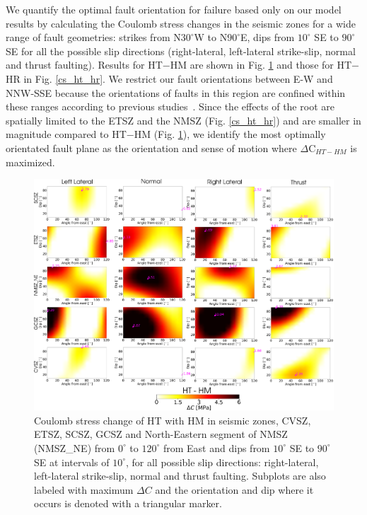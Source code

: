 \documentclass[draft,linenumbers]{agujournal2018}
\begin{document}
     We quantify the optimal fault orientation for failure based only on our model results by calculating the Coulomb stress changes in the seismic zones for a wide range of fault geometries: strikes from N$30^\circ$W to N$90^\circ$E, dips from $10^\circ$ SE to $90^\circ$ SE %
     for all the possible slip directions (right-lateral, left-lateral strike-slip, normal and thrust faulting). Results for HT$-$HM are shown in Fig. \ref{cs_ht_hm} and those for HT$-$HR in Fig. \ref{cs_ht_hr}. We restrict our fault orientations between E-W and NNW-SSE because the orientations of faults in this region are confined within these ranges according to previous studies~\citep{shumway2008focal, hurd2012intraplate, johnson2014earthquake, cooley2015new}. Since the effects of the root are spatially limited to the ETSZ and the NMSZ (Fig. \ref{cs_ht_hr}) and are smaller in magnitude compared to HT$-$HM (Fig. \ref{cs_ht_hm}), we identify the most optimally orientated fault plane as the orientation and sense of motion where $\Delta$C$_{HT-HM}$ is maximized.
\begin{figure}[ht]
    \centering
    \includegraphics[width=\linewidth]{figures/ht_hm_summ.png}
    \caption{Coulomb stress change of HT with HM in seismic zones, CVSZ, ETSZ, SCSZ, GCSZ and North-Eastern segment of NMSZ (NMSZ\_NE) from $0^\circ$ to $120^\circ$ from East and dips from $10^\circ$ SE to $90^\circ$ SE at intervals of $10^\circ$, for all possible slip directions: right-lateral, left-lateral strike-slip, normal and thrust faulting. Subplots are also labeled with maximum $\Delta C$ and the orientation and dip where it occurs is denoted with a triangular marker.}
    \label{cs_ht_hm}
\end{figure}
\end{document}
